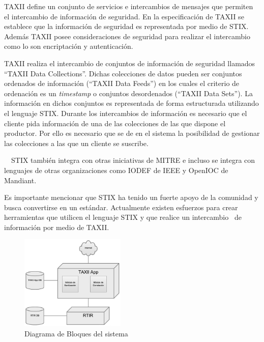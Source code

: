 {
	TAXII define un conjunto de servicios e intercambios de mensajes que permiten el intercambio de información de
	seguridad. En la especificación de TAXII se establece que la información de seguridad es representada por medio de
	STIX. Además TAXII posee consideraciones de seguridad para realizar el intercambio como lo son encriptación y
	autenticación. }


\bigskip

{
	TAXII realiza el intercambio de conjuntos de información de seguridad llamados ``TAXII Data Collections''. Dichas
	colecciones de datos pueden ser conjuntos ordenados de información (``TAXII Data Feeds'') en los cuales el criterio de
	ordenación es un \textit{timestamp} o conjuntos desordenados (``TAXII Data Sets''). La información en dichos conjuntos
	es representada de forma estructurada utilizando el lenguaje STIX. Durante los intercambios de información es necesario
	que el cliente pida información de una de las colecciones de las que dispone el productor. Por ello es necesario que se
	de en el sistema la posibilidad de gestionar las colecciones a las que un cliente se suscribe.}


\bigskip

{
	\ \ STIX también integra con otras iniciativas de MITRE e incluso se integra con lenguajes de otras organizaciones como
	IODEF de IEEE y OpenIOC de Mandiant. }


\bigskip

{
	Es importante mencionar que STIX ha tenido un fuerte apoyo de la comunidad y busca convertirse en un estándar. Actualmente
	existen esfuerzos para crear herramientas que utilicen el lenguaje STIX y que realice un intercambio \ de información
	por medio de TAXII. }

\begin{figure}
	\centering
	\includegraphics[width=1.9673in,height=1.7811in]{Analisis22-img/Analisis22-img016.png}
	\caption{Diagrama de Bloques del sistema}
	\label{fig.diagramabloques}
\end{figure}



